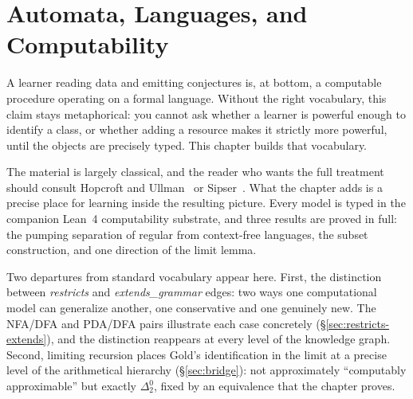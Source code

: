 
\chapter{Automata, Languages, and Computability}
\label{ch:automata}

A learner reading data and emitting conjectures is, at bottom, a computable procedure operating on a formal language. Without the right vocabulary, this claim stays metaphorical: you cannot ask whether a learner is powerful enough to identify a class, or whether adding a resource makes it strictly more powerful, until the objects are precisely typed. This chapter builds that vocabulary.

The material is largely classical, and the reader who wants the full treatment should consult Hopcroft and Ullman~\cite{HopcroftUllman1979} or Sipser~\cite{Sipser2013}. What the chapter adds is a precise place for learning inside the resulting picture. Every model is typed in the companion Lean~4 computability substrate, and three results are proved in full: the pumping separation of regular from context-free languages, the subset construction, and one direction of the limit lemma.

Two departures from standard vocabulary appear here. First, the distinction between \emph{restricts} and \emph{extends\_grammar} edges: two ways one computational model can generalize another, one conservative and one genuinely new. The NFA/DFA and PDA/DFA pairs illustrate each case concretely (\S\ref{sec:restricts-extends}), and the distinction reappears at every level of the knowledge graph. Second, limiting recursion places Gold's identification in the limit at a precise level of the arithmetical hierarchy (\S\ref{sec:bridge}): not approximately ``computably approximable'' but exactly $\Delta^0_2$, fixed by an equivalence that the chapter proves.

